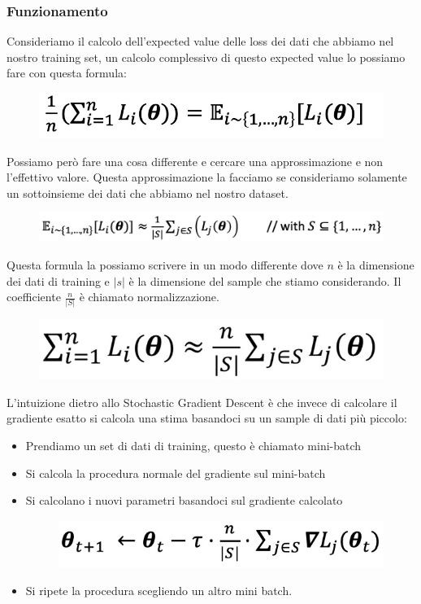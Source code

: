 \documentclass[14pt]{extreport}
\begin{document}
\subsubsection{Funzionamento}

Consideriamo il calcolo dell'expected value delle loss dei dati che abbiamo nel nostro training set, un calcolo complessivo di questo expected value
lo possiamo fare con questa formula:

\begin{figure}[H]
	\centering
	\includegraphics[width=0.7\linewidth]{260.jpeg}
\end{figure}

Possiamo però fare una cosa differente e cercare una approssimazione e non l'effettivo valore. Questa approssimazione la facciamo se consideriamo
solamente un sottoinsieme dei dati che abbiamo nel nostro dataset.

\begin{figure}[H]
	\centering
	\includegraphics[width=0.7\linewidth]{261.jpeg}
\end{figure}

Questa formula la possiamo scrivere in un modo differente dove $n$ è la dimensione dei dati di training e $|s|$ è la dimensione del sample che stiamo
considerando. Il coefficiente $\frac{n}{|S|}$ è chiamato normalizzazione.

\begin{figure}[H]
	\centering
	\includegraphics[width=0.7\linewidth]{262.jpeg}
\end{figure}

L'intuizione dietro allo Stochastic Gradient Descent è che invece di calcolare il gradiente esatto si calcola una stima basandoci su un sample di dati
più piccolo:
\begin{itemize}
	\item Prendiamo un set di dati di training, questo è chiamato mini-batch
	\item Si calcola la procedura normale del gradiente sul mini-batch
	\item Si calcolano i nuovi parametri basandoci sul gradiente calcolato
	      \begin{figure}[H]
		      \centering
		      \includegraphics[width=0.7\linewidth]{263.jpeg}
	      \end{figure}
	\item Si ripete la procedura scegliendo un altro mini batch.
\end{itemize}
\end{document}
